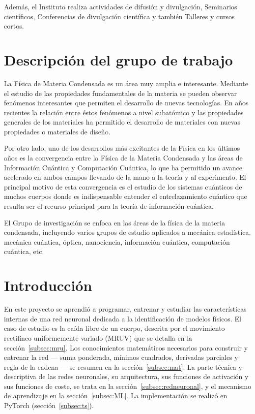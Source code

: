 \documentclass[titlepage,11pt]{article}
\begin{document}
Además, el Instituto realiza actividades de difusión y divulgación, Seminarios
científicos, Conferencias de divulgación científica y también Talleres y
cursos cortos.


\section{Descripción del grupo de trabajo}
\label{sec:grupo}
La Física de Materia Condensada es un área muy amplia e interesante. Mediante
el estudio de las propiedades fundamentales de la materia se pueden observar
fenómenos interesantes que permiten el desarrollo de nuevas tecnologías. En
años recientes la relación entre éstos fenómenos a nivel subatómico y las
propiedades generales de los materiales ha permitido el desarrollo de
materiales con nuevas propiedades o materiales de diseño.

Por otro lado, uno de los desarrollos más excitantes de la Física en los
últimos años es la convergencia entre la Física de la Materia Condensada y las
áreas de Información Cuántica y Computación Cuántica, lo que ha permitido un
avance acelerado en ambos campos llevando de la mano a la teoría y al
experimento. El principal motivo de esta convergencia es el estudio de los
sistemas cuánticos de muchos cuerpos donde es indispensable entender el
entrelazamiento cuántico que resulta ser el recurso principal para la teoría
de información cuántica.

El Grupo de investigación se enfoca en las áreas de la física de la materia
condensada, incluyendo varios grupos de estudio aplicados a mecánica
estadística, mecánica cuántica, óptica, nanociencia, información cuántica,
computación cuántica, etc.


\section{Introducción}
\label{sec:introduccion}
En este proyecto se aprendió a programar, entrenar y estudiar las
características internas de una red neuronal dedicada a la identificación de
modelos físicos. El caso de estudio es la caída libre de un cuerpo, descrita
por el movimiento rectilíneo uniformemente variado (MRUV) que se detalla en la
sección~\ref{subsec:mru}. Los conocimientos matemáticos necesarios para
construir y entrenar la red --- suma ponderada, mínimos cuadrados, derivadas
parciales y regla de la cadena --- se resumen en la
sección~\ref{subsec:mat}. La parte técnica y descriptiva de las redes
neuronales, su arquitectura, sus funciones de activación y sus funciones de
coste, se trata en la sección~\ref{subsec:redneuronal}, y el mecanismo de
aprendizaje en la sección~\ref{subsec:ML}. La implementación se realizó en
PyTorch (sección~\ref{subsec:ts}).
\end{document}
